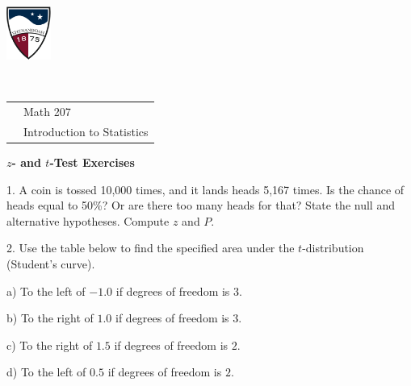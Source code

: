 \documentclass[10pt]{article}
\begin{document}
\pagestyle{empty}
\lstset{language=R, showspaces=false, showstringspaces=false}
\href{http://www.su.edu}{\includegraphics[height=1.75cm]{sulogo.eps}}
\vspace{-1.79cm}

{{\ }\hfill\small
\begin{tabular}{cl}
& Math 207\\
& Introduction to Statistics\\
\end{tabular}
}
\setlength{\baselineskip}{1.05\baselineskip}
\newcommand{\HH}{\hspace{20pt}\hphantom{a) } }


\begin{center}
\textbf{\large  $z$- and $t$-Test Exercises}
\end{center}
\smallskip

1. A coin is tossed 10,000 times, and it lands heads 5,167 times.  Is the chance
of heads equal to 50\%?  Or are there too many heads for that?
State the null and alternative hypotheses.  Compute $z$ and $P$.
\vspace{2in}

2. Use the table below to find the specified 
area under the $t$-distribution (Student's curve).

\hspace{20pt} a) To the left of $-1.0$ if degrees of freedom is $3$.
\bigskip

\hspace{20pt} b) To the right of $1.0$ if degrees of freedom is $3$.
\bigskip

\hspace{20pt} c) To the right of $1.5$ if degrees of freedom is $2$.
\bigskip

\hspace{20pt} d) To the left of $0.5$ if degrees of freedom is $2$.
\bigskip
\end{document}

